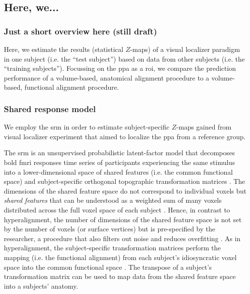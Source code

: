 \subsection{Here, we...}


\subsubsection{Just a short overview here (still draft)}

Here, we estimate the results (statistical $Z$-maps) of a visual localizer
paradigm in one subject (i.e. the ``test subject'') based on data from other
subjects (i.e. the ``training subjects'').
%
Focussing on the \ac{ppa} as a \ac{roi}, we compare the prediction performance
of a volume-based, anatomical alignment procedure to a volume-based, functional
alignment procedure.



\subsubsection{Shared response model}


%
We employ the \ac{srm} \citep{chen2015reduced, richard2019fast} in order to
estimate subject-specific $Z$-maps gained from visual localizer experiment that
aimed to localize the \ac{ppa} from a reference group.

%
The \ac{srm} is an unsupervised probabilistic latent-factor model that
decomposes \ac{bold} \ac{fmri} responses time series of participants
experiencing the same stimulus into a lower-dimensional space of shared features
(i.e. the common functional space) and subject-specific orthogonal topographic
transformation matrices \citep{kumar2020brainiak, cohen2017computational}.
%
The dimensions of the shared feature space do not correspond to individual
voxels but \textit{shared features} that can be understood as a weighted sum of
many voxels distributed across the full voxel space of each subject
\citep{kumar2020brainiak}.
%
Hence, in contrast to hyperalignment, the number of dimensions of the shared
feature space is not set by the number of voxels (or surface vertices) but is
pre-specified by the researcher, a procedure that also filters out noise and
reduces overfitting \citep{chen2015reduced}.
%
As in hyperalignment, the subject-specific transformation matrices perform the
mapping (i.e. the functional alignment) from each subject's idiosyncratic voxel
space into the common functional space \citep{kumar2020brainiak,
cohen2017computational}.
The transpose of a subject's transformation matrix can be used to map data from
the shared feature space into a subjects' anatomy.


